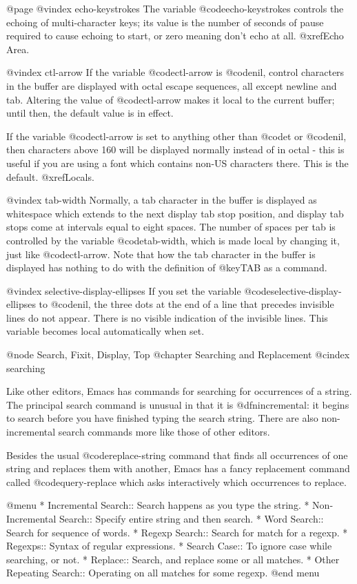 {{{{@page
@vindex echo-keystrokes
  The variable @code{echo-keystrokes} controls the echoing of multi-character
keys; its value is the number of seconds of pause required to cause echoing
to start, or zero meaning don't echo at all.  @xref{Echo Area}.

@vindex ctl-arrow
  If the variable @code{ctl-arrow} is @code{nil}, control characters in the
buffer are displayed with octal escape sequences, all except newline and
tab.  Altering the value of @code{ctl-arrow} makes it local to the current
buffer; until then, the default value is in effect.

  If the variable @code{ctl-arrow} is set to anything other than
@code{t} or @code{nil}, then characters above 160 will be displayed
normally instead of in octal - this is useful if you are using a
font which contains non-US characters there.  This is the default.
@xref{Locals}.

@vindex tab-width
  Normally, a tab character in the buffer is displayed as whitespace which
extends to the next display tab stop position, and display tab stops come
at intervals equal to eight spaces.  The number of spaces per tab is
controlled by the variable @code{tab-width}, which is made local by
changing it, just like @code{ctl-arrow}.  Note that how the tab character
in the buffer is displayed has nothing to do with the definition of
@key{TAB} as a command.

@vindex selective-display-ellipses
  If you set the variable @code{selective-display-ellipses} to @code{nil},
the three dots at the end of a line that precedes invisible
lines do not appear.  There is no visible indication of the invisible lines.
This variable becomes local automatically when set.

@node Search, Fixit, Display, Top
@chapter Searching and Replacement
@cindex searching

  Like other editors, Emacs has commands for searching for occurrences of
a string.  The principal search command is unusual in that it is
@dfn{incremental}: it begins to search before you have finished typing the
search string.  There are also non-incremental search commands more like
those of other editors.

  Besides the usual @code{replace-string} command that finds all
occurrences of one string and replaces them with another, Emacs has a fancy
replacement command called @code{query-replace} which asks interactively
which occurrences to replace.

@menu
* Incremental Search::     Search happens as you type the string.
* Non-Incremental Search::  Specify entire string and then search.
* Word Search::            Search for sequence of words.
* Regexp Search::          Search for match for a regexp.
* Regexps::                Syntax of regular expressions.
* Search Case::            To ignore case while searching, or not.
* Replace::                Search, and replace some or all matches.
* Other Repeating Search:: Operating on all matches for some regexp.
@end menu

}}}}
